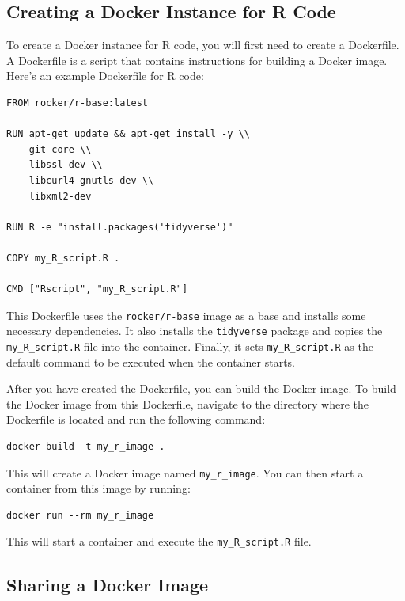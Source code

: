 \documentclass[
]{book}
\begin{document}
\hypertarget{creating-a-docker-instance-for-r-code}{%
\subsection{Creating a Docker Instance for R Code}\label{creating-a-docker-instance-for-r-code}}

To create a Docker instance for R code, you will first need to create a Dockerfile. A Dockerfile is a script that contains instructions for building a Docker image. Here's an example Dockerfile for R code:

\begin{verbatim}
FROM rocker/r-base:latest

RUN apt-get update && apt-get install -y \\
    git-core \\
    libssl-dev \\
    libcurl4-gnutls-dev \\
    libxml2-dev

RUN R -e "install.packages('tidyverse')"

COPY my_R_script.R .

CMD ["Rscript", "my_R_script.R"]
\end{verbatim}

This Dockerfile uses the \texttt{rocker/r-base} image as a base and installs some necessary dependencies. It also installs the \texttt{tidyverse} package and copies the \texttt{my\_R\_script.R} file into the container. Finally, it sets \texttt{my\_R\_script.R} as the default command to be executed when the container starts.

After you have created the Dockerfile, you can build the Docker image. To build the Docker image from this Dockerfile, navigate to the directory where the Dockerfile is located and run the following command:

\begin{verbatim}
docker build -t my_r_image .
\end{verbatim}

This will create a Docker image named \texttt{my\_r\_image}. You can then start a container from this image by running:

\begin{verbatim}
docker run --rm my_r_image
\end{verbatim}

This will start a container and execute the \texttt{my\_R\_script.R} file.

\hypertarget{sharing-a-docker-image}{%
\subsection{Sharing a Docker Image}\label{sharing-a-docker-image}}
\end{document}
